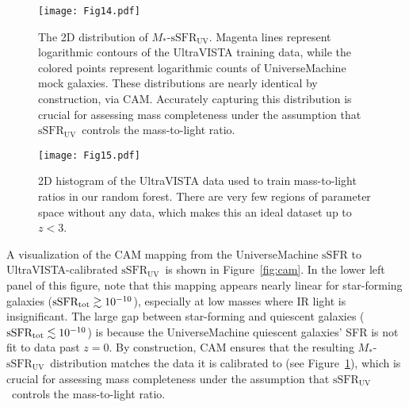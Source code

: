 \documentclass[twocolumn,twocolappendix]{aastex63}
\newcommand{\ssfruv}{$\mathrm{sSFR_{UV}}$}
\begin{document}
\begin{figure}[ht!]
\texttt{[image: Fig14.pdf]}
\caption{{The 2D distribution of $M_\ast$-\ssfruv. Magenta lines represent logarithmic contours of the UltraVISTA training data, while the colored points represent logarithmic counts of UniverseMachine mock galaxies. These distributions are nearly identical by construction, via CAM. Accurately capturing this distribution is crucial for assessing mass completeness under the assumption that \ssfruv\ controls the mass-to-light ratio.}
\label{fig:m-ssfr}}
\end{figure}

\begin{figure}[ht!]
    \texttt{[image: Fig15.pdf]}
    \caption{2D histogram of the UltraVISTA data used to train mass-to-light ratios in our random forest. There are very few regions of parameter space without any data, which makes this an ideal dataset up to $z<3$.}
    \label{fig:uvista-training-data}
\end{figure}

A visualization of the CAM mapping from the UniverseMachine $\mathrm{sSFR}$ to UltraVISTA-calibrated \ssfruv\ is shown in Figure~\ref{fig:cam}. {In the lower left panel of this figure, note that this mapping appears nearly linear for star-forming galaxies ($\rm sSFR_{tot} \gtrsim 10^{-10}$), especially at low masses where IR light is insignificant. The large gap between star-forming and quiescent galaxies ($\rm sSFR_{tot} \lesssim 10^{-10}$) is because the UniverseMachine quiescent galaxies' SFR is not fit to data past $z=0$. By construction, CAM ensures that the resulting $M_\ast$-\ssfruv\ distribution matches the data it is calibrated to (see Figure~\ref{fig:m-ssfr}), which is crucial for assessing mass completeness under the assumption that \ssfruv\ controls the mass-to-light ratio.}
\end{document}
